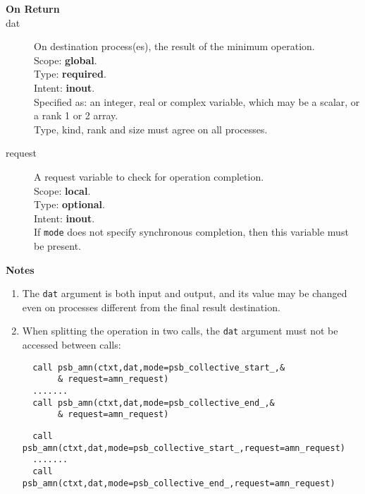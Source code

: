 \begin{description}
\item[\bf On Return]
\item[dat] On destination process(es), the result of the minimum operation.\\
Scope: {\bf global}.\\
Type: {\bf required}.\\
Intent: {\bf inout}.\\
Specified as: an integer, real or complex variable, which may be a
scalar, or a rank 1 or 2 array. \\
Type, kind, rank and size must agree on all processes.
\item[request] A request variable to check for operation completion.\\
Scope: {\bf local}.\\
Type: {\bf optional}.\\
Intent: {\bf inout}.\\
If \verb|mode| does not specify synchronous completion, then this
variable must be present.
\end{description}


{\par\noindent\large\bfseries Notes}
\begin{enumerate}
\item The \verb|dat| argument is both input and output, and its
  value may be changed even on processes different from the final
  result destination.
\item When splitting the operation in two calls, the \verb|dat|
  argument  must not be accessed between calls:
\ifpdf
\begin{verbatim}
  call psb_amn(ctxt,dat,mode=psb_collective_start_,&
       & request=amn_request)
  .......
  call psb_amn(ctxt,dat,mode=psb_collective_end_,&
       & request=amn_request)
\end{verbatim}
\else
\begin{center}
    \begin{minipage}[tl]{0.9\textwidth}
\begin{verbatim} 
  call psb_amn(ctxt,dat,mode=psb_collective_start_,request=amn_request)
  .......
  call psb_amn(ctxt,dat,mode=psb_collective_end_,request=amn_request)
\end{verbatim}
    \end{minipage}
  \end{center}
\fi
\end{enumerate}


